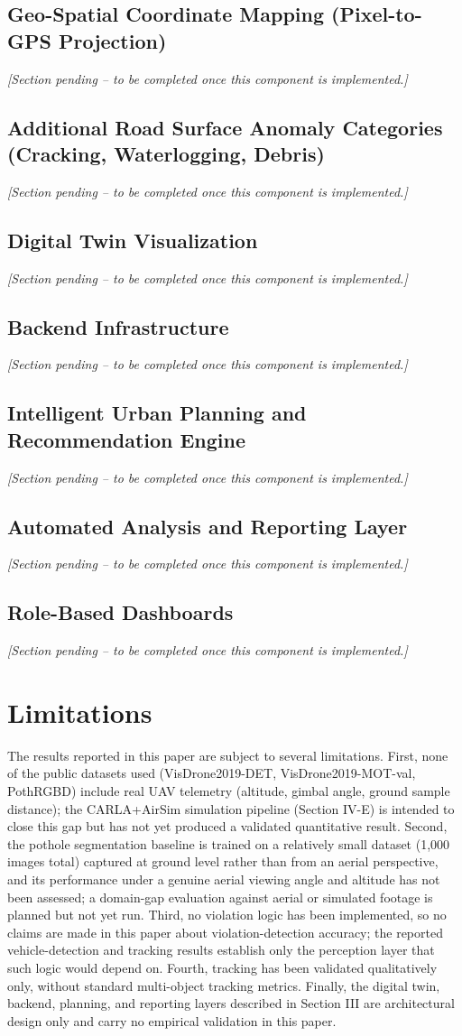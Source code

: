 \documentclass[conference]{IEEEtran}
\newcommand{\pending}{\textit{[Section pending -- to be completed once this component is implemented.]}}
\begin{document}
\subsection{Geo-Spatial Coordinate Mapping (Pixel-to-GPS Projection)}
\pending

\subsection{Additional Road Surface Anomaly Categories (Cracking, Waterlogging, Debris)}
\pending

\subsection{Digital Twin Visualization}
\pending

\subsection{Backend Infrastructure}
\pending

\subsection{Intelligent Urban Planning and Recommendation Engine}
\pending

\subsection{Automated Analysis and Reporting Layer}
\pending

\subsection{Role-Based Dashboards}
\pending

\section{Limitations}

The results reported in this paper are subject to several limitations. First, none of the public datasets used (VisDrone2019-DET, VisDrone2019-MOT-val, PothRGBD) include real UAV telemetry (altitude, gimbal angle, ground sample distance); the CARLA+AirSim simulation pipeline (Section IV-E) is intended to close this gap but has not yet produced a validated quantitative result. Second, the pothole segmentation baseline is trained on a relatively small dataset (1{,}000 images total) captured at ground level rather than from an aerial perspective, and its performance under a genuine aerial viewing angle and altitude has not been assessed; a domain-gap evaluation against aerial or simulated footage is planned but not yet run. Third, no violation logic has been implemented, so no claims are made in this paper about violation-detection accuracy; the reported vehicle-detection and tracking results establish only the perception layer that such logic would depend on. Fourth, tracking has been validated qualitatively only, without standard multi-object tracking metrics. Finally, the digital twin, backend, planning, and reporting layers described in Section III are architectural design only and carry no empirical validation in this paper.
\end{document}
